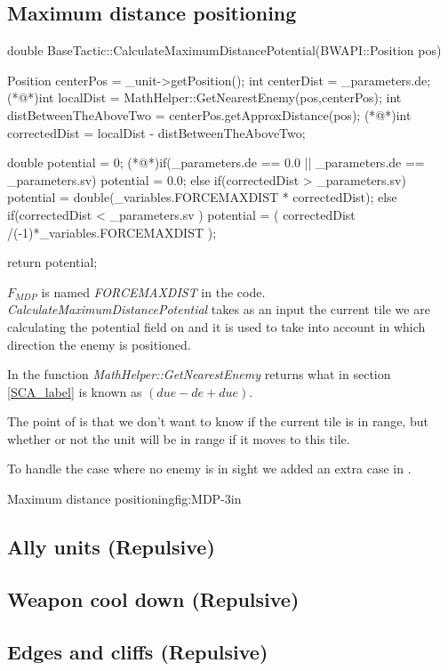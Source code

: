 {	\subsection{Maximum distance positioning}
		\begin{Sourcecode}[caption=Maximum distance]
double BaseTactic::CalculateMaximumDistancePotential(BWAPI::Position pos)
{
	Position centerPos = _unit->getPosition();
	int centerDist = _parameters.de;
	(*@\lnote@*)int localDist = MathHelper::GetNearestEnemy(pos,centerPos);
	int distBetweenTheAboveTwo = centerPos.getApproxDistance(pos);
	(*@\lnote@*)int correctedDist = localDist - distBetweenTheAboveTwo;

	double potential = 0;
	(*@\lnote@*)if(_parameters.de == 0.0 || _parameters.de == _parameters.sv)
		potential = 0.0;
	else if(correctedDist > _parameters.sv)
		potential = double(_variables.FORCEMAXDIST * correctedDist);
	else if(correctedDist < _parameters.sv )
		potential = ( correctedDist /(-1)*_variables.FORCEMAXDIST );
		
	return potential;
}
\end{Sourcecode}
	$F_{MDP}$ is named \textit{FORCEMAXDIST} in the code.
	\textit{CalculateMaximumDistancePotential} takes as an input the current tile we are calculating the potential field on and it is used to take into account in which direction the enemy is positioned.
	
	In  the function \textit{MathHelper::GetNearestEnemy} returns what in section \ref{SCA_label} is known as $(due - de + due)$.
	
	The point of  is that we don't want to know if the current tile is in range, but whether or not the unit will be in range if it moves to this tile.
	
	To handle the case where no enemy is in sight we added an extra case in .
	
			{Maximum distance positioning}{fig:MDP}{-3in}
		
	\subsection{Ally units (Repulsive)}
	\subsection{Weapon cool down (Repulsive)}
	\subsection{Edges and cliffs (Repulsive)}}